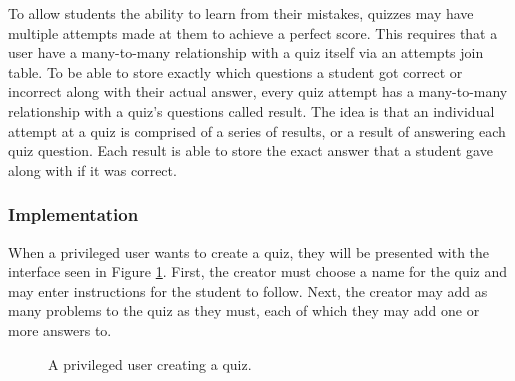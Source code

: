 To allow students the ability to learn from their mistakes, quizzes may have multiple attempts made at them to achieve a perfect score. This requires that a user have a many-to-many relationship with a quiz itself via an attempts join table. To be able to store exactly which questions a student got correct or incorrect along with their actual answer, every quiz attempt has a many-to-many relationship with a quiz's questions called result. The idea is that an individual attempt at a quiz is comprised of a series of results, or a result of answering each quiz question. Each result is able to store the exact answer that a student gave along with if it was correct.

\subsubsection{Implementation}
When a privileged user wants to create a quiz, they will be presented with the interface seen in Figure \ref{fig:screens-quiz-new}. First, the creator must choose a name for the quiz and may enter instructions for the student to follow. Next, the creator may add as many problems to the quiz as they must, each of which they may add one or more answers to.

\begin{figure}[p!]
	\centering
	\caption{A privileged user creating a quiz.}
	\label{fig:screens-quiz-new}
\end{figure}


